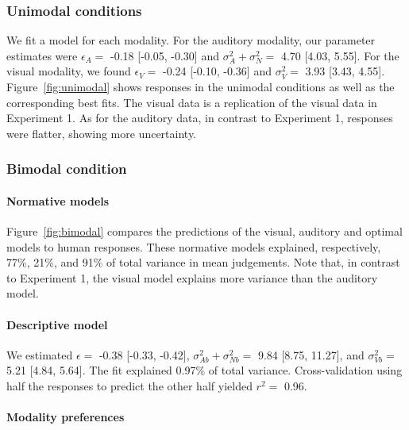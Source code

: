 \documentclass[english,man]{apa6}
\theoremstyle{definition}
\theoremstyle{definition}
\theoremstyle{definition}
\theoremstyle{remark}
\begin{document}
\subsubsection{Unimodal conditions}\label{unimodal-conditions-1}

We fit a model for each modality. For the auditory modality, our
parameter estimates were \(\epsilon_A=\) -0.18 {[}-0.05, -0.30{]} and
\(\sigma^2_A+\sigma^2_N=\) 4.70 {[}4.03, 5.55{]}. For the visual
modality, we found \(\epsilon_V=\) -0.24 {[}-0.10, -0.36{]} and
\(\sigma^2_V=\) 3.93 {[}3.43, 4.55{]}. Figure~\ref{fig:unimodal} shows
responses in the unimodal conditions as well as the corresponding best
fits. The visual data is a replication of the visual data in Experiment
1. As for the auditory data, in contrast to Experiment 1, responses were
flatter, showing more uncertainty.

\subsubsection{Bimodal condition}\label{bimodal-condition-2}

\paragraph{Normative models}\label{normative-models-1}

Figure~\ref{fig:bimodal} compares the predictions of the visual,
auditory and optimal models to human responses. These normative models
explained, respectively, 77\%, 21\%, and 91\% of total variance in mean
judgements. Note that, in contrast to Experiment 1, the visual model
explains more variance than the auditory model.

\paragraph{Descriptive model}\label{descriptive-model-2}

We estimated \(\epsilon=\) -0.38 {[}-0.33, -0.42{]},
\(\sigma^2_{Ab}+\sigma^2_{Nb}=\) 9.84 {[}8.75, 11.27{]}, and
\(\sigma^2_{Vb}=\) 5.21 {[}4.84, 5.64{]}. The fit explained 0.97\% of
total variance. Cross-validation using half the responses to predict the
other half yielded \(r^2 =\) 0.96.

\paragraph{Modality preferences}\label{modality-preferences}
\end{document}

